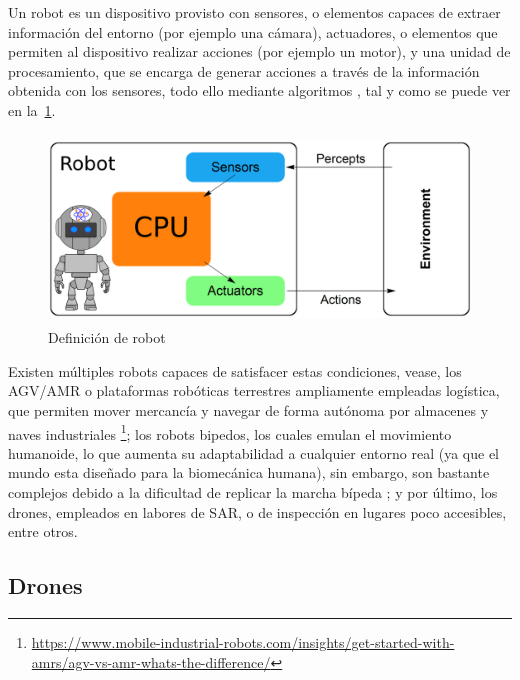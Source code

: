 Un robot es un dispositivo provisto con sensores, o elementos capaces de extraer información del entorno (por ejemplo una cámara), actuadores, o elementos que permiten al dispositivo realizar acciones (por ejemplo un motor), y una unidad de procesamiento, que se encarga de generar acciones a través de la información obtenida con los sensores, todo ello mediante algoritmos \cite{Wang2022}, tal y como se puede ver en la~\ref{fig:robot_def}.\\

\begin{figure} [tp]
	\begin{center}
	\includegraphics[height=5cm]{imagenes/cap1/3_robot.png}
	\end{center}
	\caption[Definición de robot]{Definición de robot}
	\label{fig:robot_def}
\end{figure}

Existen múltiples robots capaces de satisfacer estas condiciones, vease, los \ac{AGV}/\ac{AMR} o plataformas robóticas terrestres ampliamente empleadas logística, que permiten mover mercancía y navegar de forma autónoma por almacenes y naves industriales \footnote[6]{\url{https://www.mobile-industrial-robots.com/insights/get-started-with-amrs/agv-vs-amr-whats-the-difference/}}; los robots bipedos, los cuales emulan el movimiento humanoide, lo que aumenta su adaptabilidad a cualquier entorno real (ya que el mundo esta diseñado para la biomecánica humana), sin embargo, son bastante complejos debido a la dificultad de replicar la marcha bípeda \cite{10.3389/fmech.2020.00011}; y por último, los drones, empleados en labores de \ac{SAR}, o de inspección en lugares poco accesibles, entre otros.

\subsection{Drones}
\label{subsec:drones}

